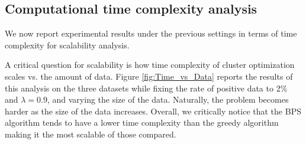 


\subsection{Computational time complexity analysis}
We now report experimental results under the previous settings in terms of time complexity for  scalability analysis.


 A critical question for scalability is how time complexity of cluster optimization scales vs. the amount of data.  Figure \ref{fig:Time_vs_Data} reports the results of this analysis on the three datasets while fixing the rate of positive data to 2\% and $\lambda=0.9$, and varying the size of the data.
Naturally, the problem becomes harder as the size of the data increases.  
Overall, we critically notice that the BPS algorithm tends to have a lower time complexity than the greedy algorithm making it the most scalable of those compared.

